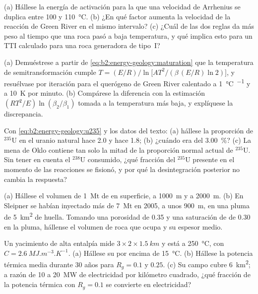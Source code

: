 \begin{exercise}[$\star\star$]\label{exo:b2:energy-geology:5}
(a) Hállese la energía de activación para la que una velocidad de Arrhenius se duplica entre 100 y
\qty{110}{\celsius}. (b) ¿En qué factor aumenta la velocidad de la reacción de Green River en el mismo
intervalo? (c) ¿Cuál de las dos reglas da más peso al tiempo que una roca pasó a baja temperatura,
y qué implica esto para un TTI calculado para una roca generadora de tipo~I?
\end{exercise}

\begin{exercise}[$\star\star$]\label{exo:b2:energy-geology:6}
(a) Demuéstrese a partir de \eqref{eq:b2:energy-geology:maturation} que la temperatura de semitransformación cumple
$T = (E/R)\big/\ln\bigl[A T^2/(\beta\,(E/R)\ln 2)\bigr]$, y resuélvase por iteración para el querógeno de Green
River calentado a \qty{1}{\celsius\per\Myr} y a \qty{10}{K} por minuto. (b) Compárese la
diferencia con la estimación $(RT^2/E)\ln(\beta_2/\beta_1)$ tomada a la temperatura más baja, y
explíquese la discrepancia.
\end{exercise}

\begin{exercise}[$\star\star$]\label{exo:b2:energy-geology:7}
Con \eqref{eq:b2:energy-geology:u235} y los datos del texto: (a) hállese la proporción de $^{235}$U en el
uranio natural hace \qty{2.0}{\Ga} y hace \qty{1.8}{\Ga}; (b) ¿cuándo era del \qty{3.00}{\percent}?
(c) La mena de Oklo contiene tan solo la mitad de la proporción normal actual de $^{235}$U. Sin tener en cuenta el $^{238}$U
consumido, ¿qué fracción del $^{235}$U presente en el momento de las reacciones se fisionó, y
por qué la desintegración posterior no cambia la respuesta?
\end{exercise}

\begin{exercise}[$\star\star$]\label{exo:b2:energy-geology:8}
(a) Hállese el volumen de \qty{1}{Mt} de  en superficie, a \qty{1000}{m} y a
\qty{2000}{m}. (b) En Sleipner se habían inyectado más de \qty{7}{Mt} en 2005, a unos
\qty{900}{m}, en una pluma de \qty{5}{km^2} de huella. Tomando una porosidad de 0.35 y una saturación de 
de 0.30 en la pluma, hállense el volumen de roca que ocupa y su espesor medio.
\end{exercise}

\begin{exercise}[$\star\star$]\label{exo:b2:energy-geology:9}
Un yacimiento de alta entalpía mide $3 \times 2 \times \qty{1.5}{km}$ y está a \qty{250}{\celsius}, con
$C = \qty{2.6}{MJ.m^{-3}.K^{-1}}$. (a) Hállese su  por encima de \qty{15}{\celsius}. (b) Hállese la
potencia térmica media durante 30 años para $R_g = 0.1$ y $0.25$. (c) Su campo cubre \qty{6}{km^2};
a razón de 10 a \qty{20}{MW} de electricidad por kilómetro cuadrado, ¿qué fracción de la potencia térmica con
$R_g = 0.1$ se convierte en electricidad?
\end{exercise}

